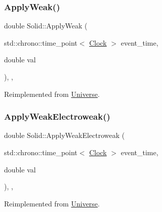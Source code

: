 \mbox{\label{classSolid_a49e35bf258104b7bce225dc21058affb}} 
\subsubsection{\texorpdfstring{Apply\+Weak()}{ApplyWeak()}}
{\footnotesize\ttfamily double Solid\+::\+Apply\+Weak (\begin{DoxyParamCaption}\item[{std\+::chrono\+::time\+\_\+point$<$ \mbox{\hyperlink{universe_8h_a0ef8d951d1ca5ab3cfaf7ab4c7a6fd80}{Clock}} $>$}]{event\+\_\+time,  }\item[{double}]{val }\end{DoxyParamCaption})\hspace{0.3cm}{\ttfamily [inline]}, {\ttfamily [final]}, {\ttfamily [virtual]}}



Reimplemented from \mbox{\hyperlink{classUniverse_a6d1226b3adec3c42a833afdbb6a65a92}{Universe}}.

\mbox{\label{classSolid_ad6c28ec896cbcf64e24a7132a144befd}} 
\subsubsection{\texorpdfstring{Apply\+Weak\+Electroweak()}{ApplyWeakElectroweak()}}
{\footnotesize\ttfamily double Solid\+::\+Apply\+Weak\+Electroweak (\begin{DoxyParamCaption}\item[{std\+::chrono\+::time\+\_\+point$<$ \mbox{\hyperlink{universe_8h_a0ef8d951d1ca5ab3cfaf7ab4c7a6fd80}{Clock}} $>$}]{event\+\_\+time,  }\item[{double}]{val }\end{DoxyParamCaption})\hspace{0.3cm}{\ttfamily [inline]}, {\ttfamily [final]}, {\ttfamily [virtual]}}



Reimplemented from \mbox{\hyperlink{classUniverse_a46a906baabb63e5d31f8b48ea1fae52e}{Universe}}.

\mbox{\label{classSolid_ae83094e9c002a7574db242ed0bff6288}} 
